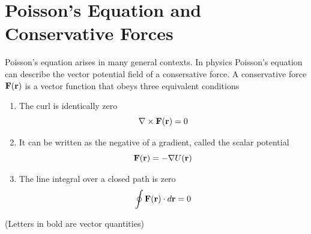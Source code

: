 % 
% 
% 
% 
% 
% 
% 
% 
% 
% 
% 
% 
% 
\section{Poisson's Equation and Conservative Forces}
Poisson's equation arises in many general contexts. In physics Poisson's equation can describe the vector potential field of a consersative force. A conservative force $\bold{F}(\bold{r})$ is a vector function that obeys three equivalent conditions
\begin{enumerate}
	\item The curl is identically zero
			\[ \nabla \times \bold{F}(\bold{r}) = 0\]
	\item It can be written as the negative of a gradient, called the scalar potential
			\[ \bold{F}(\bold{r}) = - \nabla U(\bold{r}) \]
	\item The line integral over a closed path is zero
			\[ \oint \bold{F}(\bold{r}) \cdot d\bold{r} = 0 \]

\end{enumerate}
(Letters in bold are vector quantities)


